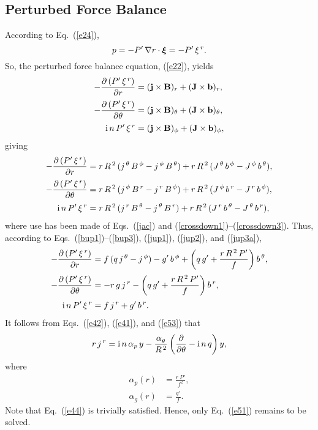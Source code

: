 \documentclass[12pt,prb,aps]{revtex4-1}
\newcommand {\bxi}{\mbox{\boldmath$\xi$}}
\begin{document}
\subsection{Perturbed Force Balance}
According to Eq.~(\ref{e24}), 
\begin{equation}
p =-P'\,\nabla r\cdot\bxi=- P'\,\xi^{\,r}.
\end{equation}
So, the perturbed force balance equation, (\ref{e22}), yields
\begin{align}
-\frac{\partial\, (P'\,\xi^{\,r})}{\partial r} &= ({\bf j}\times {\bf B})_r+({\bf J}\times {\bf b})_r,\\[0.5ex]
-\frac{\partial\,(P'\,\xi^{\,r})}{\partial \theta}&= ({\bf j}\times {\bf B})_\theta+({\bf J}\times {\bf b})_\theta,\\[0.5ex]
{\rm i}\,n\,P'\,\xi^{\,r} &= ({\bf j}\times {\bf B})_\phi+({\bf J}\times {\bf b})_\phi,
\end{align}
giving
\begin{align}
-\frac{\partial\, (P'\,\xi^{\,r})}{\partial r} &=r\,R^{\,2}\,(j^{\,\theta}\,B^{\,\phi}-j^{\,\phi}\,B^{\,\theta}) + r\,R^{\,2}\,(J^{\,\theta}\,b^{\,\phi}-J^{\,\phi}\,b^{\,\theta}),\\[0.5ex]
-\frac{\partial\,(P'\,\xi^{\,r})}{\partial \theta}&=r\,R^{\,2}\,(j^{\,\phi}\,B^{\,r}-j^{\,r}\,B^{\,\phi}) + r\,R^{\,2}\,(J^{\,\phi}\,b^{\,r}-J^{\,r}\,b^{\,\phi}),\\[0.5ex]
{\rm i}\,n\,P'\,\xi^{\,r} &=r\,R^{\,2}\,(j^{\,r}\,B^{\,\theta}-j^{\,\theta}\,B^{\,r}) + r\,R^{\,2}\,(J^{\,r}\,b^{\,\theta}-J^{\,\theta}\,b^{\,r}),
\end{align}
where use has been made of Eqs.~(\ref{jac}) and (\ref{crossdown1})--(\ref{crossdown3}). 
Thus, according to Eqs.~(\ref{bup1})--(\ref{bup3}), (\ref{jup1}), (\ref{jup2}), and (\ref{jup3a}), 
\begin{align}
-\frac{\partial\, (P'\,\xi^{\,r})}{\partial r} &= f\,(q\,j^{\,\theta} -j^{\,\phi}) - g'\,b^{\,\phi} + \left(q\,g'+\frac{r\,R^{\,2}\,P'}{f}\right)b^{\,\theta},\label{e51}\\[0.5ex]
-\frac{\partial\,(P'\,\xi^{\,r})}{\partial \theta}&=-r\,g\,j^{\,r} - \left(q\,g'+\frac{r\,R^{\,2}\,P'}{f}\right)b^{\,r},\label{e44}\\[0.5ex]
{\rm i}\,n\,P'\,\xi^{\,r} &= f\,j^{\,r}+g'\,b^{\,r}.\label{e53}
\end{align}
It follows from Eqs.~(\ref{e42}), (\ref{e41}), and (\ref{e53}) that 
\begin{equation}\label{e54}
r\,j^{\,r} = {\rm i}\,n\,\alpha_p\,y - \frac{\alpha_g}{R^{\,2}}\left(\frac{\partial}{\partial\theta}-{\rm i}\,n\,q\right)y,
\end{equation}
where
\begin{align}
\alpha_p(r) &= \frac{r\,P'}{f^2},\label{ap}\\[0.5ex]
\alpha_g (r)&= \frac{g'}{f}.\label{ag}
\end{align}
Note that Eq.~(\ref{e44}) is trivially satisfied. Hence, only Eq.~(\ref{e51}) remains to be solved. 
\end{document}
